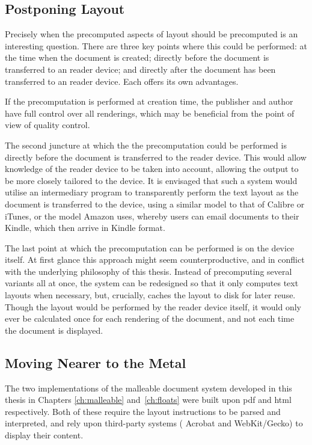 \subsection{Postponing Layout}
\label{sec:postponing}
Precisely when the precomputed aspects of layout should be precomputed is an interesting question. There are three key points where this could be performed: at the time when the document is created; directly before the document is transferred to an \ebook{} reader device; and directly after the document has been transferred to an \ebook{} reader device. Each offers its own advantages.

If the precomputation is performed at creation time, the publisher and author have full control over all renderings, which may be beneficial from the point of view of quality control. 

The second juncture at which the the precomputation could be performed is directly before the document is transferred to the reader device. This would allow knowledge of the reader device to be taken into account, allowing the output to be more closely tailored to the device. It is envisaged that such a system would utilise an intermediary program to transparently perform the text layout as the document is transferred to the device, using a similar model to that of Calibre or iTunes, or the model Amazon uses, whereby users can email documents to their Kindle, which then arrive in Kindle format.

The last point at which the precomputation can be performed is on the device itself. At first glance this approach might seem counterproductive, and in conflict with the underlying philosophy of this thesis. Instead of precomputing several variants all at once, the system can be redesigned so that it only computes text layouts when necessary, but, crucially, caches the layout to disk for later reuse. Though the layout would be performed by the \ebook{} reader device itself, it would only ever be calculated once for each rendering of the document, and not each time the document is displayed.

\subsection{Moving Nearer to the Metal}
The two implementations of the malleable document system developed in this thesis in Chapters \ref{ch:malleable} and~\ref{ch:floats} were built upon \gls{pdf} and \gls{html} respectively. Both of these require the layout instructions to be parsed and interpreted, and rely upon third-party systems (\eg{} Acrobat and WebKit/Gecko) to display their content.


